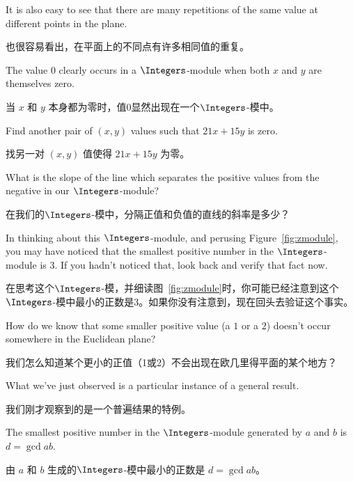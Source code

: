 It is also easy to see
that there are many repetitions of the same value at different points 
in the plane.

也很容易看出，在平面上的不同点有许多相同值的重复。

\begin{exer}
The value $0$ clearly occurs in a $\Integers$-module when both
$x$ and $y$ are themselves zero.

当 $x$ 和 $y$ 本身都为零时，值0显然出现在一个$\Integers$-模中。

Find another pair of $(x,y)$ 
values such that $21x+15y$ is zero.

找另一对 $(x,y)$ 值使得 $21x+15y$ 为零。

What is the slope of
the line which separates the positive values from the negative
in our $\Integers$-module?

在我们的$\Integers$-模中，分隔正值和负值的直线的斜率是多少？
\end{exer} 

In thinking about this $\Integers$-module, and perusing 
Figure~\ref{fig:zmodule}, you may have noticed that the smallest 
positive number in the $\Integers$-module is 3.  If you hadn't 
noticed that, look back and verify that fact now.

在思考这个$\Integers$-模，并细读图~\ref{fig:zmodule}时，你可能已经注意到这个$\Integers$-模中最小的正数是3。如果你没有注意到，现在回头去验证这个事实。

\begin{exer}
How do we know that some smaller positive value (a $1$ or a $2$) doesn't
occur somewhere in the Euclidean plane?

我们怎么知道某个更小的正值（1或2）不会出现在欧几里得平面的某个地方？
\end{exer}

What we've just observed is a particular instance of a general result.

我们刚才观察到的是一个普遍结果的特例。

\begin{thm} \label{gcduniqueexists}
The smallest positive number in the $\Integers$-module generated by
$a$ and $b$ is $d = \gcd{a}{b}$.

由 $a$ 和 $b$ 生成的$\Integers$-模中最小的正数是 $d = \gcd{a}{b}$。
\end{thm}


